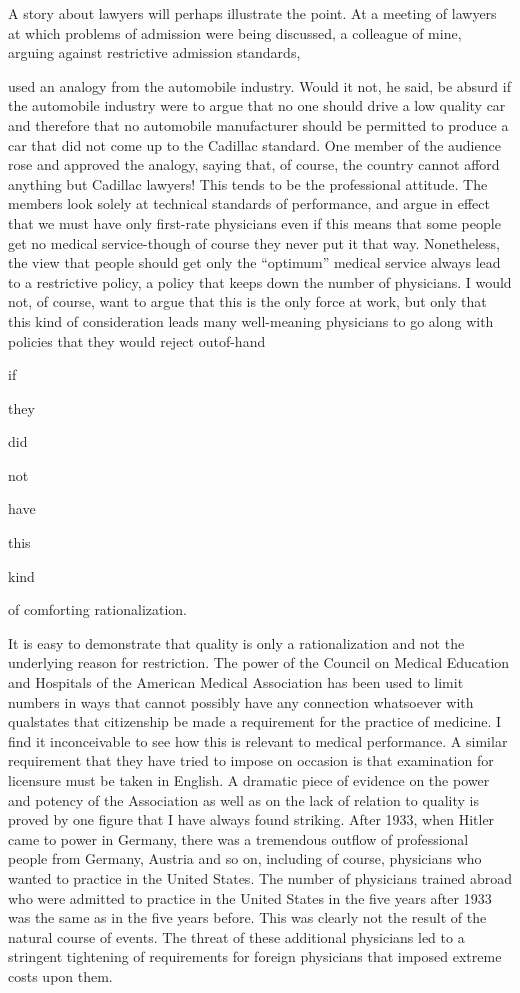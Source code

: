 \documentclass[11pt,openany]{book}
\begin{document}
A story about lawyers will perhaps illustrate the point. At a meeting of lawyers at which problems of admission were being discussed, a colleague of mine, arguing against restrictive admission standards,

used an analogy from the automobile industry. Would it not, he said, be absurd if the automobile industry were to argue that no one should drive a low quality car and therefore that no automobile manufacturer should be permitted to produce a car that did not come up to the Cadillac standard. One member of the audience rose and approved the analogy, saying that, of course, the country cannot afford anything but Cadillac lawyers! This tends to be the professional attitude. The members look solely at technical standards of performance, and argue in effect that we must have only first-rate physicians even if this means that some people get no medical service-though of course they never put it that way. Nonetheless, the view that people should get only the ``optimum'' medical service always lead to a restrictive policy, a policy that keeps down the number of physicians. I would not, of course, want to argue that this is the only force at work, but only that this kind of consideration leads many well-meaning physicians to go along with policies that they would reject outof-hand

if

they

did

not

have

this

kind

of comforting rationalization.

It is easy to demonstrate that quality is only a rationalization and not the underlying reason for restriction. The power of the Council on Medical Education and Hospitals of the American Medical Association has been used to limit numbers in ways that cannot possibly have any connection whatsoever with qualstates that citizenship be made a requirement for the practice of medicine. I find it inconceivable to see how this is relevant to medical performance. A similar requirement that they have tried to impose on occasion is that examination for licensure must be taken in English. A dramatic piece of evidence on the power and potency of the Association as well as on the lack of relation to quality is proved by one figure that I have always found striking. After 1933, when Hitler came to power in Germany, there was a tremendous outflow of professional people from Germany, Austria and so on, including of course, physicians who wanted to practice in the United States. The number of physicians trained abroad who were admitted to practice in the United States in the five years after 1933 was the same as in the five years before. This was clearly not the result of the natural course of events. The threat of these additional physicians led to a stringent tightening of requirements for foreign physicians that imposed extreme costs upon them.
\end{document}
